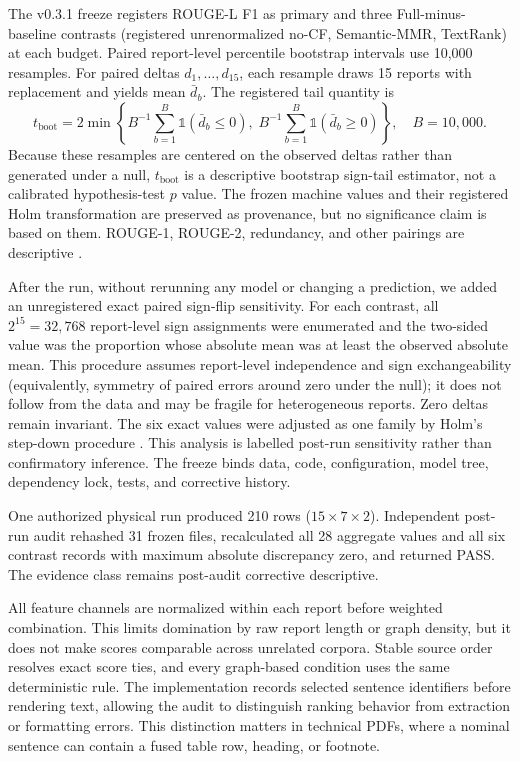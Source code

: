 \documentclass[applsci,article,submit,moreauthors]{Definitions/mdpi}
\begin{document}
The v0.3.1 freeze registers ROUGE-L F1 as primary and three Full-minus-baseline contrasts (registered unrenormalized no-CF, Semantic-MMR, TextRank) at each budget. Paired report-level percentile bootstrap intervals use 10,000 resamples. For paired deltas $d_1,\ldots,d_{15}$, each resample draws 15 reports with replacement and yields mean $\bar d_b$. The registered tail quantity is
\begin{equation}
t_{\mathrm{boot}}=2\min\left\{B^{-1}\sum_{b=1}^{B}\mathbb{1}(\bar d_b\leq0),\;B^{-1}\sum_{b=1}^{B}\mathbb{1}(\bar d_b\geq0)\right\},\quad B=10{,}000.
\end{equation}
Because these resamples are centered on the observed deltas rather than generated under a null, $t_{\mathrm{boot}}$ is a descriptive bootstrap sign-tail estimator, not a calibrated hypothesis-test $p$ value. The frozen machine values and their registered Holm transformation are preserved as provenance, but no significance claim is based on them. ROUGE-1, ROUGE-2, redundancy, and other pairings are descriptive \cite{cameron2008bootstrap}.

After the run, without rerunning any model or changing a prediction, we added an unregistered exact paired sign-flip sensitivity. For each contrast, all $2^{15}=32{,}768$ report-level sign assignments were enumerated and the two-sided value was the proportion whose absolute mean was at least the observed absolute mean. This procedure assumes report-level independence and sign exchangeability (equivalently, symmetry of paired errors around zero under the null); it does not follow from the data and may be fragile for heterogeneous reports. Zero deltas remain invariant. The six exact values were adjusted as one family by Holm's step-down procedure \cite{holm1979simple}. This analysis is labelled post-run sensitivity rather than confirmatory inference. The freeze binds data, code, configuration, model tree, dependency lock, tests, and corrective history.

One authorized physical run produced 210 rows ($15\times7\times2$). Independent post-run audit rehashed 31 frozen files, recalculated all 28 aggregate values and all six contrast records with maximum absolute discrepancy zero, and returned PASS. The evidence class remains post-audit corrective descriptive.

All feature channels are normalized within each report before weighted combination. This limits domination by raw report length or graph density, but it does not make scores comparable across unrelated corpora. Stable source order resolves exact score ties, and every graph-based condition uses the same deterministic rule. The implementation records selected sentence identifiers before rendering text, allowing the audit to distinguish ranking behavior from extraction or formatting errors. This distinction matters in technical PDFs, where a nominal sentence can contain a fused table row, heading, or footnote.
\end{document}
